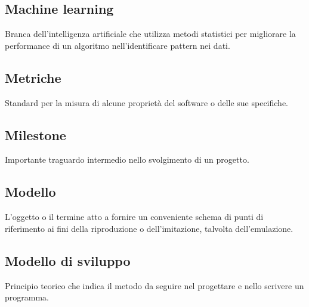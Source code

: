 \documentclass[../glossario.tex]{subfiles}
\begin{document}
\subsection*{Machine learning} 
Branca dell'intelligenza artificiale che utilizza metodi statistici per migliorare la performance di un algoritmo nell'identificare pattern nei dati.

\subsection*{Metriche} 
Standard per la misura di alcune proprietà del software o delle sue specifiche.

\subsection*{Milestone} 
Importante traguardo intermedio nello svolgimento di un progetto.

\subsection*{Modello} 
L'oggetto o il termine atto a fornire un conveniente schema di punti di riferimento ai fini della riproduzione o dell'imitazione, talvolta dell'emulazione.

\subsection*{Modello di sviluppo} 
Principio teorico che indica il metodo da seguire nel progettare e nello scrivere un programma.

    
\end{document}
